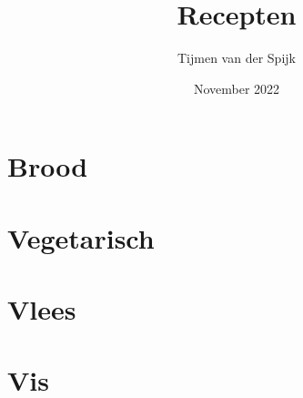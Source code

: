 \documentclass[12pt]{article}
\title{Recepten}
\author{Tijmen van der Spijk}
\date{November 2022}
\begin{document}
\maketitle
\tableofcontents
\pagebreak

\section{Brood}

\section{Vegetarisch}

\pagebreak

\pagebreak

\pagebreak

\pagebreak

\pagebreak

\pagebreak

\pagebreak

\section{Vlees}

\pagebreak

\pagebreak

\pagebreak

\section{Vis}

\pagebreak

\pagebreak
\end{document}
